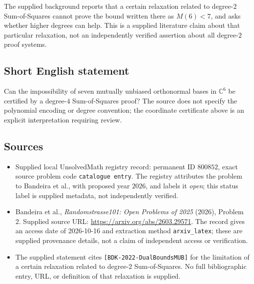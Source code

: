 \documentclass[11pt]{article}
\newcommand{\C}{\mathbb{C}}
\begin{document}
The supplied background reports that a certain relaxation related to degree-$2$ Sum-of-Squares cannot prove the bound written there as $M(6)<7$, and asks whether higher degrees can help. This is a supplied literature claim about that particular relaxation, not an independently verified assertion about all degree-$2$ proof systems.
\subsection{Short English statement}
Can the impossibility of seven mutually unbiased orthonormal bases in $\C^6$ be certified by a degree-$4$ Sum-of-Squares proof? The source does not specify the polynomial encoding or degree convention; the coordinate certificate above is an explicit interpretation requiring review.
\subsection{Sources}
\begin{itemize}
\item Supplied local UnsolvedMath registry record: permanent ID $800852$, exact source problem code \texttt{catalogue entry}. The registry attributes the problem to Bandeira et al., with proposed year $2026$, and labels it \emph{open}; this status label is supplied metadata, not independently verified.
\item Bandeira et al., \emph{Randomstrasse101: Open Problems of 2025} (2026), Problem 2. Supplied source URL: \url{https://arxiv.org/abs/2603.29571}. The record gives an access date of 2026-10-16 and extraction method \texttt{arxiv\_latex}; these are supplied provenance details, not a claim of independent access or verification.
\item The supplied statement cites \texttt{[BDK-2022-DualBoundsMUB]} for the limitation of a certain relaxation related to degree-$2$ Sum-of-Squares. No full bibliographic entry, URL, or definition of that relaxation is supplied.
\end{itemize}
\end{document}
